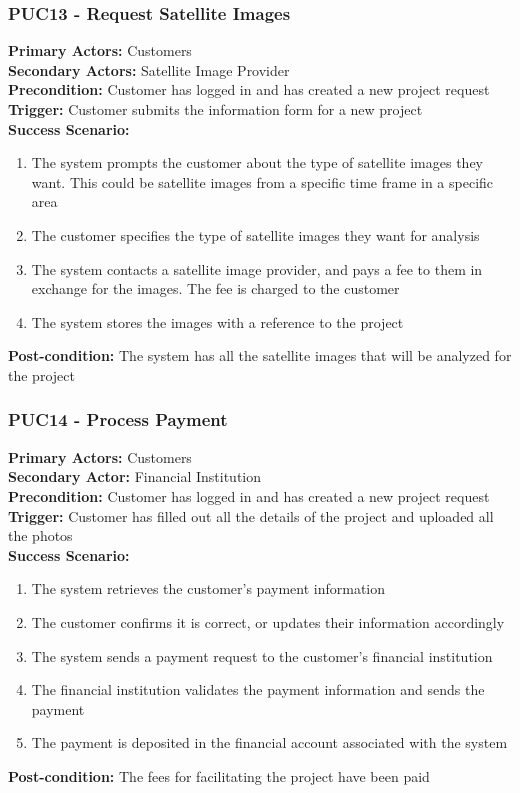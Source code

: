 \documentclass[12pt]{article}
\begin{document}
\subsubsection*{PUC13 - Request Satellite Images}
\label{sec:PUC13}
\textbf{Primary Actors:} Customers\\
\textbf{Secondary Actors:} Satellite Image Provider\\
\textbf{Precondition:} Customer has logged in and has created a new project request\\
\textbf{Trigger:} Customer submits the information form for a new project\\
\textbf{Success Scenario:}
\begin{enumerate}
    \item The system prompts the customer about the type of satellite images they want. This could be satellite images from a specific time frame in a specific area
    \item The customer specifies the type of satellite images they want for analysis
    \item The system contacts a satellite image provider, and pays a fee to them in exchange for the images. The fee is charged to the customer
    \item The system stores the images with a reference to the project
\end{enumerate}
\textbf{Post-condition:} The system has all the satellite images that will be analyzed for the project

\subsubsection*{PUC14 - Process Payment}
\label{sec:PUC14}
\textbf{Primary Actors:} Customers\\
\textbf{Secondary Actor:} Financial Institution\\
\textbf{Precondition:} Customer has logged in and has created a new project request\\
\textbf{Trigger:} Customer has filled out all the details of the project and uploaded all the photos\\
\textbf{Success Scenario:}
\begin{enumerate}
    \item The system retrieves the customer's payment information
    \item The customer confirms it is correct, or updates their information accordingly
    \item The system sends a payment request to the customer's financial institution
    \item The financial institution validates the payment information and sends the payment
    \item The payment is deposited in the financial account associated with the system
\end{enumerate}
\textbf{Post-condition:} The fees for facilitating the project have been paid
\newpage
\end{document}

